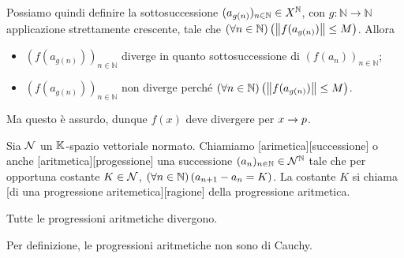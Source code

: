 \par Possiamo quindi definire la sottosuccessione $(a_{g(n)})_{n \in \mathbb{N}} \in X^{\mathbb{N}}$, con $g: \mathbb{N} \rightarrow \mathbb{N}$ applicazione strettamente crescente, tale che $\ForAll{n \in \mathbb{N}}{\Norm{f(a_{g(n)})} \leq M}$. Allora
\begin{itemize}
	\item $(f(a_{g(n)}))_{n \in \mathbb{N}}$ diverge in quanto sottosuccessione di $(f(a_n))_{n \in \mathbb{N}}$;
	\item $(f(a_{g(n)}))_{n \in \mathbb{N}}$ non diverge perch\'e $\ForAll{n \in \mathbb{N}}{\Norm{f(a_{g(n)})} \leq M}$.
\end{itemize}
Ma questo \`e assurdo, dunque $f(x)$ deve divergere per $x \rightarrow p$. \EndProof
\begin{Definition}
	Sia $\mathcal{N}$ un $\mathbb{K}$-spazio vettoriale normato.
	Chiamiamo [arimetica][successione] o anche [aritmetica][progessione] una successione $(a_n)_{n \in \mathbb{N}} \in \mathcal{N}^\mathbb{N}$ tale che per opportuna costante $K \in \mathcal{N}$, $\left ( \forall n \in \mathbb{N} \right ) \left ( a_{n + 1} - a_n = K \right )$. La costante $K$ si chiama [di una progressione aritemetica][ragione] della progressione aritmetica.
\end{Definition}
\begin{Theorem}
	Tutte le progressioni aritmetiche divergono.
\end{Theorem}
\Proof Per definizione, le progressioni aritmetiche non sono di Cauchy. \EndProof
